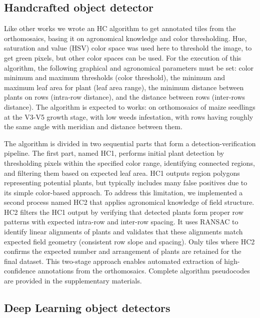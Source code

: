 \documentclass{article}
\begin{document}
\subsection{Handcrafted object detector}

Like other works \cite{davidPlantDetectionCounting2021,garcia-martinezDigitalCountCorn2020,liuEstimatingMaizeSeedling2022} 
we wrote an HC algorithm to get annotated tiles from the orthomosaics, 
basing it on agronomical knowledge and color thresholding.
Hue, saturation and value (HSV) color space was used here to threshold the image,
to get green pixels, but other color spaces can be used.
For the execution of this algorithm, the following graphical and agronomical 
parameters must be set: color minimum and maximum thresholds (color threshold), the minimum and maximum 
leaf area for plant (leaf area range), the minimum distance between plants on rows (intra-row distance),
and the distance between rows (inter-rows distance). 
The algorithm is expected to works: on orthomosaics of maize seedlings at the V3-V5 growth stage,
with low weeds infestation, with rows having roughly the same angle with meridian and distance between them.

The algorithm is divided in two sequential parts that form a detection-verification pipeline. The first part,
named HC1, performs initial plant detection by thresholding pixels within the specified color range, 
identifying connected regions, and filtering them based on expected leaf area. HC1 outputs region polygons
representing potential plants, but typically includes many false positives due to its simple color-based approach.
To address this limitation, we implemented a second process named HC2 that applies agronomical 
knowledge of field structure. HC2 filters the HC1 output by verifying that detected plants form proper row 
patterns with expected intra-row and inter-row spacing. It uses RANSAC to identify linear alignments of plants 
and validates that these alignments match expected field geometry (consistent row slope and spacing).
Only tiles where HC2 confirms the expected number and arrangement of plants are retained for the final dataset.
This two-stage approach enables automated extraction of high-confidence annotations from the orthomosaics.
Complete algorithm pseudocodes are provided in the supplementary materials.

\subsection{Deep Learning object detectors}
\end{document}
